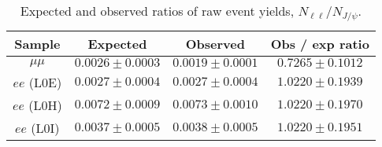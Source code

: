 \begin{table}
\centering
\begin{tabular}{|c|c|c|c|}
\hline
 Sample 			& Expected 			& Observed 			& Obs / exp ratio \\ \hline
$\mu\mu$ 	& $ 0.0026  \pm  0.0003 $ 	& $ 0.0019  \pm  0.0001 $ 	& $ 0.7265  \pm  0.1012 $ \\
\hline
$ee$ (L0E) 	& $ 0.0027  \pm  0.0004 $ 	& $ 0.0027  \pm  0.0004 $ 	& $ 1.0220  \pm  0.1939 $ \\

$ee$ (L0H) 	& $ 0.0072  \pm  0.0009 $ 	& $ 0.0073  \pm  0.0010 $ 	& $ 1.0220  \pm  0.1970 $ \\

$ee$ (L0I) 	& $ 0.0037  \pm  0.0005 $ 	& $ 0.0038  \pm  0.0005 $ 	& $ 1.0220  \pm  0.1951 $ \\

\hline 
 \end{tabular}
 \caption{Expected and observed ratios of raw event yields, $N_{\ell\ell} / N_{J/\psi}$. }
 \label{tab:RKst_expectations}
\end{table}

\clearpage
